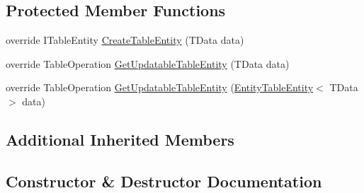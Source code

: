 \subsection*{Protected Member Functions}
\begin{DoxyCompactItemize}
\item 
override I\+Table\+Entity \hyperlink{classCqrs_1_1Azure_1_1BlobStorage_1_1DataStores_1_1TableStorageDataStore_ac28ce10858480acc61d3a3df4fb3dae4}{Create\+Table\+Entity} (T\+Data data)
\item 
override Table\+Operation \hyperlink{classCqrs_1_1Azure_1_1BlobStorage_1_1DataStores_1_1TableStorageDataStore_aa4dc1bfeeb55483b68d8af3414000f7a}{Get\+Updatable\+Table\+Entity} (T\+Data data)
\item 
override Table\+Operation \hyperlink{classCqrs_1_1Azure_1_1BlobStorage_1_1DataStores_1_1TableStorageDataStore_a2a6af1eed637f7ac828078a883881fd3}{Get\+Updatable\+Table\+Entity} (\hyperlink{classCqrs_1_1Azure_1_1BlobStorage_1_1EntityTableEntity}{Entity\+Table\+Entity}$<$ T\+Data $>$ data)
\end{DoxyCompactItemize}
\subsection*{Additional Inherited Members}


\subsection{Constructor \& Destructor Documentation}
\mbox{\label{classCqrs_1_1Azure_1_1BlobStorage_1_1DataStores_1_1TableStorageDataStore_a29c0fb07b5b5e6655a24cc831484646a}} 
